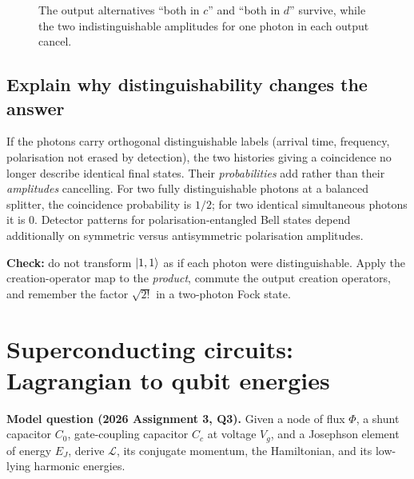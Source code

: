 \begin{figure}[htbp]
\centering
{}
\caption{The output alternatives ``both in $c$'' and ``both in $d$'' survive, while the two indistinguishable amplitudes for one photon in each output cancel.}
\end{figure}

\subsection{Explain why distinguishability changes the answer}
If the photons carry orthogonal distinguishable labels (arrival time, frequency, polarisation not erased by detection), the two histories giving a coincidence no longer describe identical final states. Their \emph{probabilities} add rather than their \emph{amplitudes} cancelling. For two fully distinguishable photons at a balanced splitter, the coincidence probability is $1/2$; for two identical simultaneous photons it is $0$. Detector patterns for polarisation-entangled Bell states depend additionally on symmetric versus antisymmetric polarisation amplitudes.
\begin{examtip}
\textbf{Check:} do not transform $\left\lvert 1,1\right\rangle$ as if each photon were distinguishable. Apply the creation-operator map to the \emph{product}, commute the output creation operators, and remember the factor $\sqrt{2!}$ in a two-photon Fock state.\end{examtip}

\section{Superconducting circuits: Lagrangian to qubit energies}\label{sec:cpbsol}
\textbf{Model question (2026 Assignment 3, Q3).} Given a node of flux $\Phi$, a shunt capacitor $C_0$, gate-coupling capacitor $C_c$ at voltage $V_g$, and a Josephson element of energy $E_J$, derive $\mathcal L$, its conjugate momentum, the Hamiltonian, and its low-lying harmonic energies.

